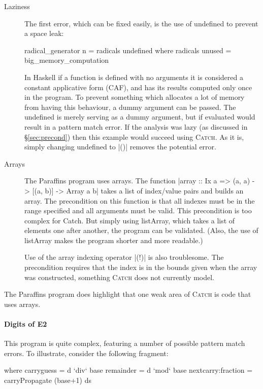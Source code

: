 \documentclass[preprint]{sigplanconf}
\newcommand{\C}[1]{\textsf{#1}}
\newcommand{\catch}{\textsc{Catch}}
\begin{document}
\begin{description}
\item[Laziness] The first error, which can be fixed easily, is the use of \C{undefined} to prevent a space leak:

    \begin{code}
    radical_generator n = radicals undefined
      where radicals unused = big_memory_computation
    \end{code}

    In Haskell if a function is defined with no arguments it is considered a constant applicative form (CAF), and has its results computed only once in the program. To prevent something which allocates a lot of memory from having this behaviour, a dummy argument can be passed. The \C{undefined} is merely serving as a dummy argument, but if evaluated would result in a pattern match error. If the analysis was lazy (as discussed in \S\ref{sec:precond}) then this example would succeed using \catch{}. As it is, simply changing \C{undefined} to |()| removes the potential error.

\item[Arrays] The Paraffins program uses arrays. The function |array :: Ix a => (a, a) -> [(a, b)] -> Array a b| takes a list of index/value pairs and builds an array. The precondition on this function is that all indexes must be in the range specified and all arguments must be valid. This precondition is too complex for Catch. But simply using \C{listArray}, which takes a list of elements one after another, the program can be validated. (Also, the use of \C{listArray} makes the program shorter and more readable.)

    Use of the array indexing operator |(!)| is also troublesome. The precondition requires that the index is in the bounds given when the array was constructed, something \catch{} does not currently model.
\end{description}

The Paraffins program does highlight that one weak area of \catch{} is code that uses arrays.

\paragraph{Digits of E2}

This program is quite complex, featuring a number of possible pattern match errors. To illustrate, consider the following fragment:

\begin{code}
  where  carryguess = d `div` base
         remainder = d `mod` base
         nextcarry:fraction = carryPropagate (base+1) ds
\end{code}
\end{document}
